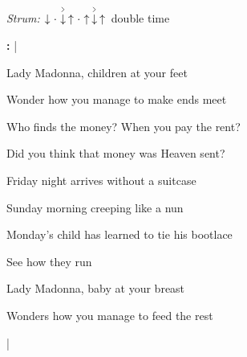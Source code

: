 \begin{song}


\begin{headerbox}
\RaiseBoxWithAccents
{} \quad
\textit{Strum:} $\Down\Miss\AccentDown\Up\Miss\Up\AccentDown\Up$ double time
\end{headerbox}

\begin{hchordbox}
\end{hchordbox}

\bigskip

\Large

\Intro\textbf{:}     |      \par

\bigskip

Lady Madonna, children at your feet \par
{}Wonder how you manage to make ends meet \par
{}Who finds the money? When you pay the rent? \par
{}Did you think that money was Heaven sent? \par

\bigskip

Friday night arrives without a suitcase \par
{}Sunday morning creeping like a nun \par
{}Monday's child has learned to tie his bootlace \par
{}See how they run \par

\bigskip

Lady Madonna, baby at your breast \par
{}Wonders how you manage to feed the rest \par

\bigskip

    |      \par


\end{song}
